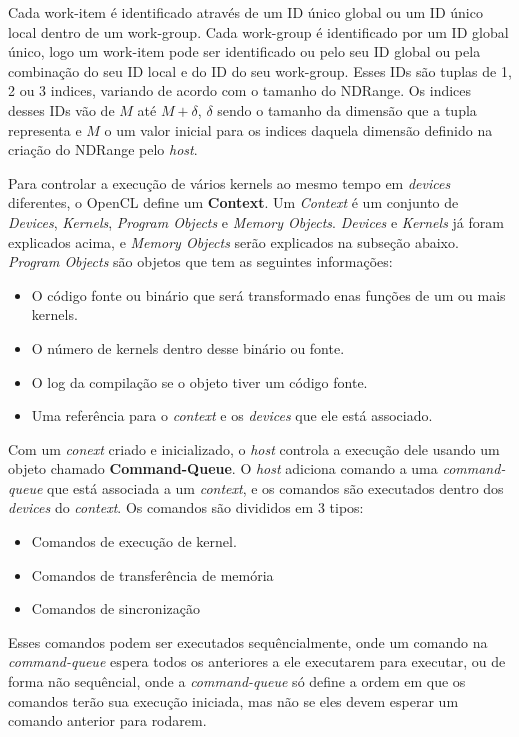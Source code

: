 Cada work-item é identificado através de um ID único global ou um ID único local dentro de um work-group. Cada work-group é identificado
por um ID global único, logo um work-item pode ser identificado ou pelo seu ID global ou pela combinação do seu ID local e do ID do seu 
work-group. Esses IDs são tuplas de 1, 2 ou 3 indices, variando de acordo com o tamanho do NDRange. Os indices desses IDs vão de $M$ até
$M+\delta$, $\delta$ sendo o tamanho da dimensão que a tupla representa e $M$ o um valor inicial para os indices daquela dimensão definido
na criação do NDRange pelo \textit{host}.

Para controlar a execução de vários kernels ao mesmo tempo em \textit{devices} diferentes, o OpenCL define um \textbf{Context}.
Um \textit{Context} é um conjunto de \textit{Devices}, \textit{Kernels}, \textit{Program Objects} e \textit{Memory Objects}.
\textit{Devices} e \textit{Kernels} já foram explicados acima, e \textit{Memory Objects} serão explicados na subseção abaixo.
\textit{Program Objects} são objetos que tem as seguintes informações:
\begin{itemize}
  \item O código fonte ou binário que será transformado enas funções de um ou mais kernels.
  \item O número de kernels dentro desse binário ou fonte.
  \item O log da compilação se o objeto tiver um código fonte.
  \item Uma referência para o \textit{context} e os \textit{devices} que ele está associado.
\end{itemize}

Com um \textit{conext} criado e inicializado, o \textit{host} controla a execução dele usando um objeto chamado \textbf{Command-Queue}.
O \textit{host} adiciona comando a uma \textit{command-queue} que está associada a um \textit{context}, e os comandos são executados
dentro dos \textit{devices} do \textit{context}. Os comandos são divididos em 3 tipos:
\begin{itemize}
  \item Comandos de execução de kernel.
  \item Comandos de transferência de memória
  \item Comandos de sincronização
\end{itemize}
Esses comandos podem ser executados sequêncialmente, onde um comando na \textit{command-queue} espera todos os anteriores a ele executarem para
executar, ou de forma não sequêncial, onde a \textit{command-queue} só define a ordem em que os comandos terão sua execução iniciada, mas não se 
eles devem esperar um comando anterior para rodarem.

